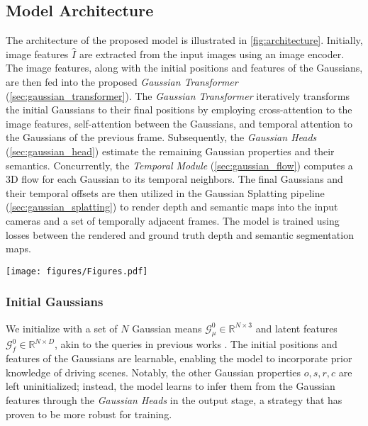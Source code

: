 \documentclass[10pt,twocolumn,letterpaper]{article}
\begin{document}
\subsection{Model Architecture}\label{sec:model_arch}
The architecture of the proposed model is illustrated in \cref{fig:architecture}.
Initially, image features $\hat{I}$ are extracted from the input images using an image encoder.
The image features, along with the initial positions and features of the Gaussians, are then fed into the proposed \emph{Gaussian Transformer} (\cref{sec:gaussian_transformer}).
The \emph{Gaussian Transformer} iteratively transforms the initial Gaussians to their final positions by employing cross-attention to the image features, self-attention between the Gaussians, and temporal attention to the Gaussians of the previous frame. 
Subsequently, the \emph{Gaussian Heads} (\cref{sec:gaussian_head}) estimate the remaining Gaussian properties and their semantics.
Concurrently, the \emph{Temporal Module} (\cref{sec:gaussian_flow}) computes a 3D flow for each Gaussian to its temporal neighbors.
The final Gaussians and their temporal offsets are then utilized in the Gaussian Splatting pipeline (\cref{sec:gaussian_splatting}) to render depth and semantic maps into the input cameras and a set of temporally adjacent frames.
The model is trained using losses between the rendered and ground truth depth and semantic segmentation maps.

\begin{figure*}
    \centering
    \texttt{[image: figures/Figures.pdf]}
    \caption{
        \textbf{Overview of GaussianFlowOcc.}
        After encoding a set of input images, the \emph{Gaussian Transformer} iteratively estimates the position and features of 3D Gaussian distributions.
        The \emph{Gaussian Heads} then predict opacity, scale, rotation and semantics of these Gaussians.
        The model is trained using Gaussian Splatting with 2D labels, generated from off-the-shelf models.
        The \emph{Temporal Module} simultaneously estimates 3D temporal offsets for each Gaussian to correct temporal inconsistencies when using \emph{Temporal Gaussian Splatting}.
    }
    \label{fig:architecture}
\end{figure*}

\subsubsection{Initial Gaussians} \label{sec:initial}
We initialize with a set of $N$ Gaussian means $\mathcal{G}^0_\mu \in \mathbb{R}^{N \times 3}$ and latent features $\mathcal{G}^0_f \in \mathbb{R}^{N \times D}$, akin to the queries in previous works \cite{li2022bevformer, liu2022petr,wang2023exploring}.
The initial positions and features of the Gaussians are learnable, enabling the model to incorporate prior knowledge of driving scenes.
Notably, the other Gaussian properties $o, s, r, c$ are left uninitialized; instead, the model learns to infer them from the Gaussian features through the \emph{Gaussian Heads} in the output stage, a strategy that has proven to be more robust for training.
\end{document}
